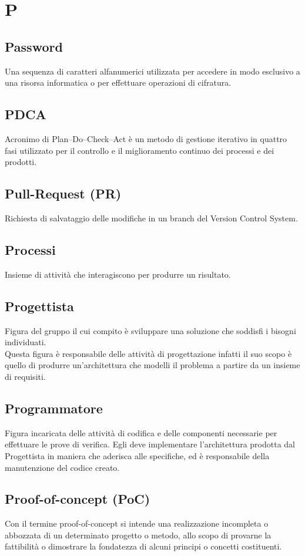 \section{P}
	\subsection{Password}
		 Una sequenza di caratteri alfanumerici utilizzata per accedere in modo esclusivo a una risorsa informatica o per effettuare operazioni di cifratura.
	\subsection{PDCA} 
		 Acronimo di Plan–Do–Check–Act è un metodo di gestione iterativo in quattro fasi utilizzato per il controllo e il miglioramento continuo dei processi e dei prodotti.
	\subsection{Pull-Request (PR)}  
		Richiesta di salvataggio delle modifiche in un branch del Version Control System.
	\subsection{Processi}  
		Insieme di attività che interagiscono per produrre un risultato.
	\subsection{Progettista} 
		Figura del gruppo il cui compito  è sviluppare una soluzione che soddisfi i bisogni individuati. \\
		Questa figura è responsabile delle attività di progettazione infatti il suo scopo è quello di produrre un’architettura che modelli il problema a partire da un insieme di requisiti.
	\subsection{Programmatore} 
		Figura incaricata delle attività di codifica e delle componenti necessarie per effettuare le prove di verifica. Egli deve implementare l’architettura prodotta dal Progettista in maniera che aderisca alle specifiche, ed è responsabile della manutenzione del codice creato.
	\subsection{Proof-of-concept (PoC) }  
		Con il termine proof-of-concept si intende una realizzazione incompleta o abbozzata di un determinato progetto o metodo, allo scopo di provarne la fattibilità o dimostrare la fondatezza di alcuni principi o concetti costituenti.





\newpage